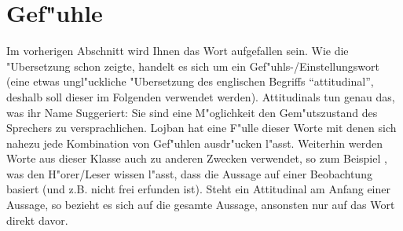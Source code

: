 \section{Gef"uhle}
Im vorherigen Abschnitt wird Ihnen das Wort  aufgefallen sein. Wie die "Ubersetzung schon zeigte, handelt es sich um
ein Gef"uhls-/Einstellungswort (eine etwas ungl"uckliche "Ubersetzung des englischen Begriffs ``attitudinal'', deshalb soll dieser im
Folgenden verwendet werden).
Attitudinals tun genau das, was ihr Name Suggeriert: Sie sind eine M"oglichkeit den Gem"utszustand des Sprechers zu versprachlichen. Lojban hat eine F"ulle dieser Worte mit denen sich nahezu jede Kombination von Gef"uhlen ausdr"ucken l"asst.
Weiterhin werden Worte aus dieser Klasse auch zu anderen Zwecken verwendet, so zum Beispiel , was den H"orer/Leser
wissen l"asst, dass die Aussage auf einer Beobachtung basiert (und z.B. nicht frei erfunden ist).
Steht ein Attitudinal am Anfang einer Aussage, so bezieht es sich auf die gesamte Aussage, ansonsten nur auf das Wort direkt davor.
